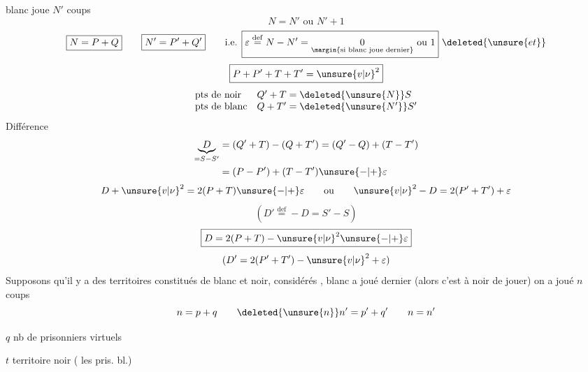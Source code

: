blanc joue $N'$ coups
\[
N=N'\text{ ou }N'+1
\]
\[
\boxed{N=P+Q}\qquad\boxed{N'=P'+Q'}\qquad\text{i.e. }\boxed{\varepsilon\overset{\mathrm{def}}{=}N-N'=\underset{\margin{\text{si blanc joue dernier}}}{0}\text{ ou }1}\ \deleted{\unsure{et}}
\]
\[
\boxed{P+P'+T+T'=\unsure{v|\nu}^2}
\]
\[
\begin{array}{ll}
\text{pts de noir}&Q'+T=\deleted{\unsure{N}}S\\
\text{pts de blanc}&Q+T'=\deleted{\unsure{N'}}S'
\end{array}
\]
Différence
\[
\begin{aligned}
\underbrace{D}_{=S-S'}&=(Q'+T)-(Q+T')=(Q'-Q)+(T-T')\\
&=(P-P')+(T-T')\unsure{-|+}\varepsilon
\end{aligned}
\]
\[
D+\unsure{v|\nu}^2=2(P+T)\unsure{-|+}\varepsilon
\qquad\text{ou}\qquad \unsure{v|\nu}^2-D=2(P'+T')+\varepsilon
\]
\[
(D'\overset{\mathrm{def}}{=}-D=S'-S)
\]
\[
\boxed{D=2(P+T)-\unsure{v|\nu}^2\unsure{-|+}\varepsilon}
\]
\[
(D'=2(P'+T')-\unsure{v|\nu}^2+\varepsilon)
\]
Supposons qu'il y a des territoires
constitués de blanc et noir, considérés
, blanc a joué dernier
(alors c'est à noir de jouer) on a
joué $n$ coups
\[
n=p+q\qquad\deleted{\unsure{n}}n'=p'+q'\qquad n=n'
\]

$q$ nb de prisonniers virtuels

$t$ territoire noir ( les pris. bl.)

